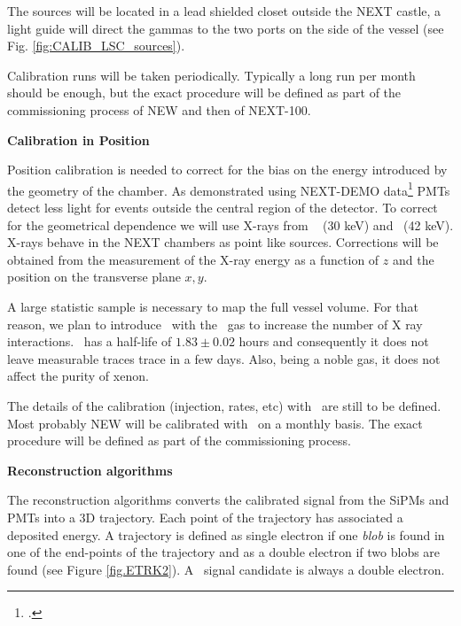 The sources will be located in a lead shielded closet outside the NEXT castle, a light guide will direct the gammas to the two ports on the side of the vessel  
(see Fig. \ref{fig:CALIB_LSC_sources}). 

Calibration runs will be taken periodically. Typically a long run per month should be enough, but the exact procedure will be defined as part of the commissioning process of NEW and then of NEXT-100.  

{\bf Calibration in Position}

Position calibration is needed to correct for the bias on the energy introduced by the geometry of the chamber. As demonstrated using NEXT-DEMO data\footcite{Lorca:2014sra} PMTs detect less light for events outside the central region of the detector. To correct for the geometrical dependence we will use X-rays from \Xe ~ (30 keV)  and \KR ~(42 keV). X-rays behave in the NEXT chambers as point like sources.
Corrections will be obtained from the measurement of the X-ray energy as a function of $z$ and the position on the transverse plane $x,y$.

A large statistic sample is necessary to map the full vessel volume.
For that reason, we plan to introduce \KR\ with the \Xe\ gas to increase the number of X ray interactions.  \KR\ has a half-life of $1.83 \pm 0.02$ hours and consequently 
it does not leave measurable traces trace in a few days. Also, being
a noble gas, it does not affect the purity of xenon.

The details of the calibration (injection, rates, etc) with \KR\ are still to be defined.
Most probably NEW will be calibrated with \KR\ on a monthly basis. The exact procedure will be defined as part of the commissioning process. 

 
{\bf Reconstruction algorithms}

The reconstruction algorithms converts the calibrated signal from the SiPMs and PMTs into a 3D trajectory. Each point of the trajectory has associated a deposited energy. 
A trajectory is defined as single electron if one {\it blob} is found in one of the end-points of the trajectory and as a double electron if two blobs are found (see Figure \ref{fig.ETRK2}). 
A \bb\ signal candidate is always a double electron.  

